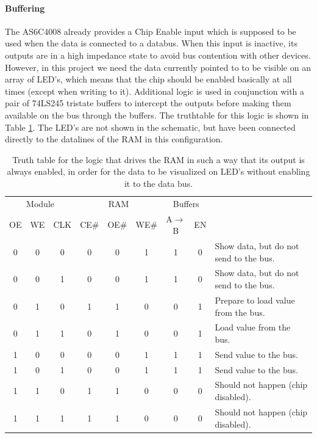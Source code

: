 \paragraph{Buffering} The AS6C4008 already provides a Chip Enable input which is supposed to be used when the data is connected to a databus. When this input is inactive, its outputs are in a high impedance state to avoid bus contention with other devices. However, in this project we need the data currently pointed to to be visible on an array of LED's, which means that the chip should be enabled basically at all times (except when writing to it). Additional logic is used in conjunction with a pair of 74LS245 tristate buffers to intercept the outputs before making them available on the bus through the buffers. The truthtable for this logic is shown in Table \ref{tab:ramlogic}. The LED's are not shown in the schematic, but have been connected directly to the datalines of the RAM in this configuration. 

\begin{table}[H]
  \centering
  \begin{tabular}{ccc|ccc|cc|l}
    \multicolumn{3}{c}{Module} & \multicolumn{3}{c}{RAM} & \multicolumn{2}{c}{Buffers} & \\ 
    OE & WE & CLK & CE\# & OE\# & WE\# & A$\rightarrow$B & EN &  \\ \hline
    0 & 0 & 0    & 0 & 0 & 1 & 1 & 0   & Show data, but do not send to the bus. \\
    0 & 0 & 1    & 0 & 0 & 1 & 1 & 0   & Show data, but do not send to the bus. \\
    0 & 1 & 0    & 1 & 1 & 0 & 0 & 1   & Prepare to load value from the bus. \\
    0 & 1 & 1    & 0 & 1 & 0 & 0 & 1   & Load value from the bus. \\
    1 & 0 & 0    & 0 & 0 & 1 & 1 & 1   & Send value to the bus. \\
    1 & 0 & 1    & 0 & 0 & 1 & 1 & 1   & Send value to the bus. \\
    1 & 1 & 0    & 1 & 1 & 0 & 0 & 0   & Should not happen (chip disabled). \\
    1 & 1 & 1    & 1 & 1 & 0 & 0 & 0   & Should not happen (chip disabled). \\
  \end{tabular}
  
  \caption{Truth table for the logic that drives the RAM in such a way that its output is always enabled, in order for the data to be visualized on LED's without enabling it to the data bus.}
  \label{tab:ramlogic}
\end{table}

